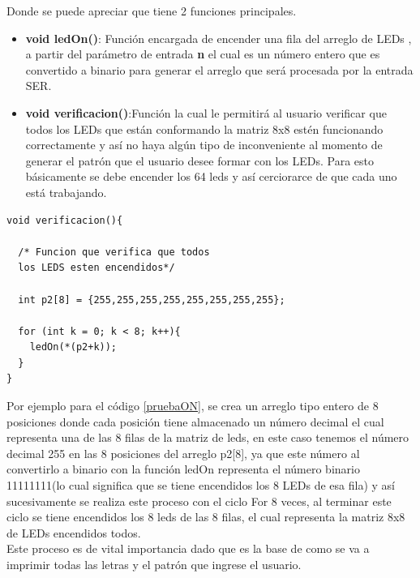 \documentclass{article}
\begin{document}
Donde se puede apreciar que tiene 2 funciones principales.

\begin{itemize}
    \item \textbf{ void ledOn()}: Función encargada de encender una fila del arreglo de LEDs , a partir del parámetro de entrada \textbf{n} el cual es un número entero que es convertido a binario para generar el arreglo que será procesada por la entrada SER.
    \item \textbf{void verificacion()}:Función la cual le permitirá al usuario verificar que todos los LEDs que están conformando la matriz 8x8 estén funcionando correctamente  y así no haya algún tipo de inconveniente al momento de generar el patrón que el usuario desee formar con los LEDs. Para esto básicamente se debe encender los 64 leds y así cerciorarce de que  cada uno está trabajando.
    
\end{itemize}

\begin{lstlisting}[language=arduino, label=pruebaON]
void verificacion(){ 
  
  /* Funcion que verifica que todos 
  los LEDS esten encendidos*/
  
  int p2[8] = {255,255,255,255,255,255,255,255};
  
  for (int k = 0; k < 8; k++){
    ledOn(*(p2+k));
  }
}
\end{lstlisting}

Por ejemplo para el código \ref{pruebaON}, se crea un arreglo tipo entero de 8 posiciones donde cada posición tiene almacenado un número decimal el cual representa una de las 8 filas de la matriz de leds, en este caso tenemos el número decimal 255 en las 8 posiciones del arreglo p2[8], ya que este número al convertirlo a binario con la función ledOn  representa el número binario 11111111(lo cual significa que se tiene encendidos los 8 LEDs de esa fila) y así sucesivamente se realiza este proceso con el ciclo For 8 veces, al  terminar este ciclo se tiene encendidos los 8 leds de las 8 filas, el cual representa la matriz 8x8 de LEDs encendidos todos.\\

Este proceso es de vital importancia dado que es la base de como se va a imprimir todas las letras y el patrón que ingrese el usuario.\\
\end{document}
